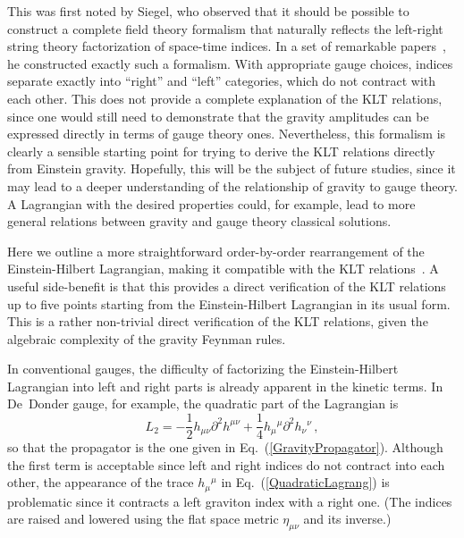 \documentclass[12pt]{livrev}
\begin{document}
This was first noted by Siegel, who observed that it should be possible
to construct a complete field theory formalism that naturally reflects the
left-right string theory factorization of space-time indices.  In a
set of remarkable papers~\cite{Siegel93A,Siegel93B,Siegel94}, he
constructed exactly such a formalism.  With appropriate gauge choices,
indices separate exactly into ``right'' and ``left'' categories, which do
not contract with each other. This does not provide
a complete explanation of the KLT relations, since one would still need
to demonstrate that the gravity amplitudes can be expressed directly
in terms of gauge theory ones.  Nevertheless, this formalism is
clearly a sensible starting point for trying to derive the KLT
relations directly from Einstein gravity.  Hopefully, this will be the
subject of future studies, since it may lead to a deeper understanding
of the relationship of gravity to gauge theory.  A Lagrangian with the
desired properties could, for example, lead to more general relations
between gravity and gauge theory classical solutions.

Here we outline a more straightforward order-by-order rearrangement of
the Einstein-Hilbert Lagrangian, making it compatible with the KLT
relations~\cite{BernGrant}.  A useful side-benefit is that this
provides a direct verification of the KLT relations up to
five points starting from the Einstein-Hilbert Lagrangian in its usual
form.  This is a rather non-trivial direct verification of the KLT
relations, given the algebraic complexity of the gravity Feynman
rules.

In conventional gauges, the difficulty of factorizing the
Einstein-Hilbert Lagrangian into left and right parts is already
apparent in the kinetic terms. In De~Donder gauge, for example, the
quadratic part of the Lagrangian is
%
\begin{equation}
L_2 =  - \frac{1}{2} h_{\mu\nu} \partial^2 h^{\mu\nu} 
+ \frac{1}{4} h_{\mu}{}^{\mu} \partial^2 h_{\nu}{}^{\nu} \,,
\label{QuadraticLagrang}
\end{equation}
%
so that the propagator is the one given in
Eq.~(\ref{GravityPropagator}).  Although the first term is acceptable
since left and right indices do not contract into each other, the
appearance of the trace $h_{\mu}{}^{\mu}$ in
Eq.~(\ref{QuadraticLagrang}) is problematic since it contracts a left
graviton index with a right one. (The indices are raised and lowered
using the flat space metric $\eta_{\mu\nu}$ and its inverse.)
\end{document}
